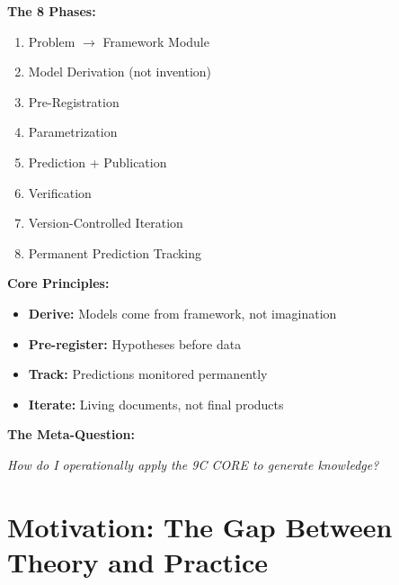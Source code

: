 
\begin{tcolorbox}[colback=blue!5!white, colframe=blue!75!black,
    title=\textbf{Quick Reference: The EBF Application Process}]

\textbf{The 8 Phases:}
\begin{enumerate}[nosep]
    \item Problem $\to$ Framework Module
    \item Model Derivation (not invention)
    \item Pre-Registration
    \item Parametrization
    \item Prediction + Publication
    \item Verification
    \item Version-Controlled Iteration
    \item Permanent Prediction Tracking
\end{enumerate}

\textbf{Core Principles:}
\begin{itemize}[nosep]
    \item \textbf{Derive:} Models come from framework, not imagination
    \item \textbf{Pre-register:} Hypotheses before data
    \item \textbf{Track:} Predictions monitored permanently
    \item \textbf{Iterate:} Living documents, not final products
\end{itemize}

\textbf{The Meta-Question:}
\begin{center}
\textit{How do I operationally apply the 9C CORE to generate knowledge?}
\end{center}

\end{tcolorbox}



\section{Motivation: The Gap Between Theory and Practice}
\label{sec:apply-motivation}

